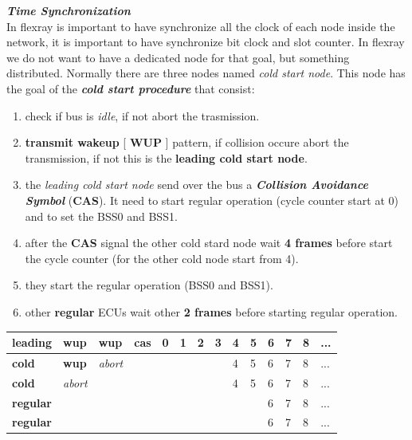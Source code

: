 \textbf{\textit{Time Synchronization}} \\
In flexray is important to have synchronize all the clock of each node inside the network, it is important to have synchronize bit clock and slot counter. In flexray we do not want to have a dedicated node for that goal, but something distributed. Normally there are three nodes named \textit{cold start node}. This node has the goal of the \textbf{\textit{cold start procedure}} that consist:
\begin{enumerate}[nosep]
    \item check if bus is \textit{idle}, if not abort the trasmission.
    \item \textbf{transmit wakeup} [ \textbf{WUP} ] pattern, if collision occure abort the transmission, if not this is the \textbf{leading cold start node}.
    \item the \textit{leading cold start node} send over the bus a \textbf{\textit{Collision Avoidance Symbol}} (\textbf{CAS}). It need to start regular operation (cycle counter start at 0) and to set the BSS0 and BSS1.
    \item after the \textbf{CAS} signal the other cold stard node wait \textbf{4 frames} before start the cycle counter (for the other cold node start from 4).
    \item they start the regular operation (BSS0 and BSS1).
    \item other \textbf{regular} ECUs wait other \textbf{2 frames} before starting regular operation.
\end{enumerate}
\begin{tabular}{ | p{1.5cm} | p{1cm} | p{1cm} | p{1cm} | p{0.5cm} | p{0.5cm} | p{0.5cm} | p{0.5cm} | p{0.5cm} | p{0.5cm} | p{0.5cm} | p{0.5cm} | p{0.5cm} | p{0.5cm} | } \hline
    \textbf{leading} & \textbf{wup} & \textbf{wup} & \textbf{cas} & 0 & 1 & 2 & 3 & 4 & 5 & 6 & 7 & 8 & ... \\ \hline
    \textbf{cold} & \textbf{wup} & \textit{abort} & & & & & & 4 & 5 & 6 & 7 & 8 & ...\\ \hline
    \textbf{cold} & \textit{abort} & & & & & & & 4 & 5 & 6 & 7 & 8 & ... \\ \hline
    \textbf{regular} & & & & & & & & & & 6 & 7 & 8 & ... \\ \hline
    \textbf{regular} & & & & & & & & & & 6 & 7 & 8 & ... \\ \hline
\end{tabular}

